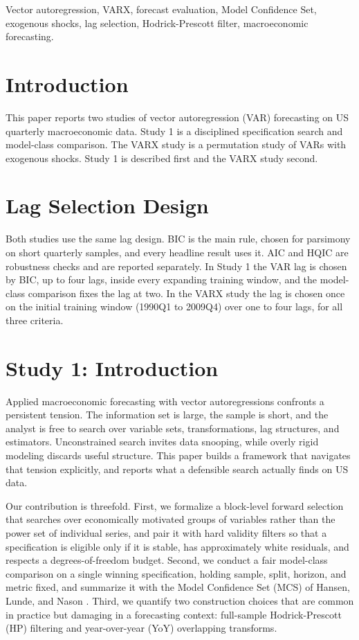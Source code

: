 \documentclass[conference]{IEEEtran}
\begin{document}
\begin{IEEEkeywords}
Vector autoregression, VARX, forecast evaluation, Model Confidence Set, exogenous shocks, lag selection, Hodrick-Prescott filter, macroeconomic forecasting.
\end{IEEEkeywords}

\section{Introduction}
This paper reports two studies of vector autoregression (VAR) forecasting on US quarterly macroeconomic data. Study 1 is a disciplined specification search and model-class comparison. The VARX study is a permutation study of VARs with exogenous shocks. Study 1 is described first and the VARX study second.

\section{Lag Selection Design}
Both studies use the same lag design. BIC is the main rule, chosen for parsimony on short quarterly samples, and every headline result uses it. AIC and HQIC are robustness checks and are reported separately. In Study 1 the VAR lag is chosen by BIC, up to four lags, inside every expanding training window, and the model-class comparison fixes the lag at two. In the VARX study the lag is chosen once on the initial training window (1990Q1 to 2009Q4) over one to four lags, for all three criteria.

\section{Study 1: Introduction}
Applied macroeconomic forecasting with vector autoregressions confronts a persistent tension. The information set is large, the sample is short, and the analyst is free to search over variable sets, transformations, lag structures, and estimators. Unconstrained search invites data snooping, while overly rigid modeling discards useful structure. This paper builds a framework that navigates that tension explicitly, and reports what a defensible search actually finds on US data.

Our contribution is threefold. First, we formalize a block-level forward selection that searches over economically motivated groups of variables rather than the power set of individual series, and pair it with hard validity filters so that a specification is eligible only if it is stable, has approximately white residuals, and respects a degrees-of-freedom budget. Second, we conduct a fair model-class comparison on a single winning specification, holding sample, split, horizon, and metric fixed, and summarize it with the Model Confidence Set (MCS) of Hansen, Lunde, and Nason \cite{hln2011}. Third, we quantify two construction choices that are common in practice but damaging in a forecasting context: full-sample Hodrick-Prescott (HP) filtering \cite{hp1997} and year-over-year (YoY) overlapping transforms.
\end{document}
